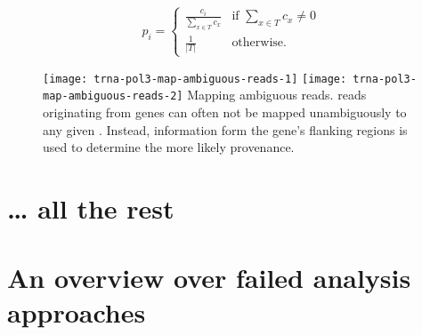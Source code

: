 \begin{equation}
    p_i = \begin{cases}
        \frac{c_i}{\sum_{x \in T}c_x} & \text{if } \sum_{x \in T}c_x \neq 0 \\
        \frac{1}{\vert T \rvert} & \text{otherwise.}
    \end{cases}
\end{equation}

\begin{figure}[h]
    \centering
    \begingroup
        \texttt{[image: trna-pol3-map-ambiguous-reads-1]}
    \endgroup
    \begingroup
        \texttt{[image: trna-pol3-map-ambiguous-reads-2]}
    \endgroup
        {Mapping ambiguous \chip reads.}
        {\chip reads originating from \trna genes can often not be mapped
        unambiguously to any given \trna. Instead, information form the gene’s
        flanking regions is used to determine the more likely provenance.}
\end{figure}

\section{… all the rest}

\section{An overview over failed analysis approaches}
